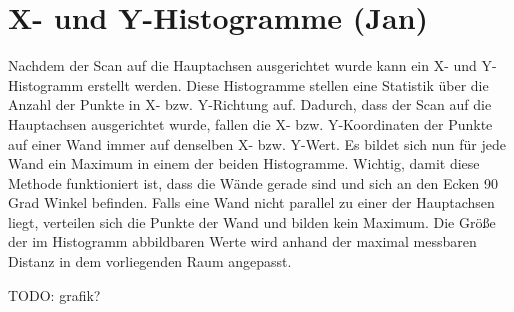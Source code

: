 \section{X- und Y-Histogramme (Jan)}

Nachdem der Scan auf die Hauptachsen ausgerichtet wurde kann ein X- und Y-Histogramm erstellt werden. Diese Histogramme stellen eine Statistik über die Anzahl der Punkte in X- bzw. Y-Richtung auf.
Dadurch, dass der Scan auf die Hauptachsen ausgerichtet wurde, fallen die X- bzw. Y-Koordinaten der Punkte auf einer Wand immer auf denselben X- bzw. Y-Wert. Es bildet sich nun für jede Wand ein Maximum in einem der beiden Histogramme. Wichtig, damit diese Methode funktioniert ist, dass die Wände gerade sind und sich an den Ecken 90 Grad Winkel befinden. Falls eine Wand nicht parallel zu einer der Hauptachsen liegt, verteilen sich die Punkte der Wand und bilden kein Maximum. Die Größe der im Histogramm abbildbaren Werte wird anhand der maximal messbaren Distanz in dem vorliegenden Raum angepasst.

TODO: grafik?